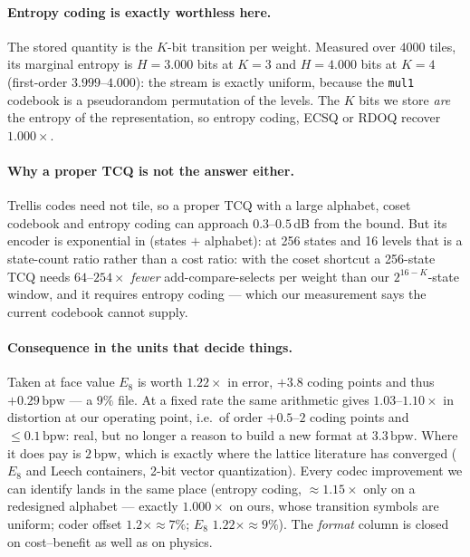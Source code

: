 \documentclass[11pt,a4paper]{article}
\newcommand{\bpw}{\,\mathrm{bpw}}
\begin{document}
\paragraph{Entropy coding is exactly worthless here.} The stored quantity is the $K$-bit
transition per weight. Measured over $4000$ tiles, its marginal entropy is $H=3.000$ bits at
$K=3$ and $H=4.000$ bits at $K=4$ (first-order $3.999$--$4.000$): the stream is exactly uniform,
because the \texttt{mul1} codebook is a pseudorandom permutation of the levels. The $K$ bits we
store \emph{are} the entropy of the representation, so entropy coding, ECSQ or RDOQ recover
$1.000\times$.

\paragraph{Why a proper TCQ is not the answer either.} Trellis codes need not tile, so a proper
TCQ with a large alphabet, coset codebook and entropy coding can approach $0.3$--$0.5$\,dB from
the bound. But its encoder is exponential in (states $+$ alphabet): at 256 states and 16 levels
that is a state-count ratio rather than a cost ratio: with the coset shortcut a 256-state TCQ needs
$64$--$254\times$ \emph{fewer} add-compare-selects per weight than our $2^{16-K}$-state window,
and it requires entropy coding --- which our measurement says the current codebook cannot supply.

\paragraph{Consequence in the units that decide things.} Taken at face value $E_8$ is worth
$1.22\times$ in error, $+3.8$ coding points and thus $+0.29\bpw$ --- a $9\%$ file. At a fixed rate
the same arithmetic gives $1.03$--$1.10\times$ in distortion at our operating point, i.e.\ of order
$+0.5$--$2$ coding points and $\le0.1\bpw$: real, but no longer a reason to build a new format at
$3.3\bpw$. Where it does pay is $2\bpw$, which is exactly where the lattice literature has
converged ($E_8$ and Leech containers, 2-bit vector quantization). Every codec improvement we can
identify lands in the same place (entropy coding, $\approx1.15\times$ only on a redesigned alphabet ---
exactly $1.000\times$ on ours, whose transition symbols are uniform; coder offset $1.2\times\approx7\%$;
$E_8$ $1.22\times\approx9\%$). The \emph{format} column is closed on cost--benefit as well as on physics.
\end{document}
